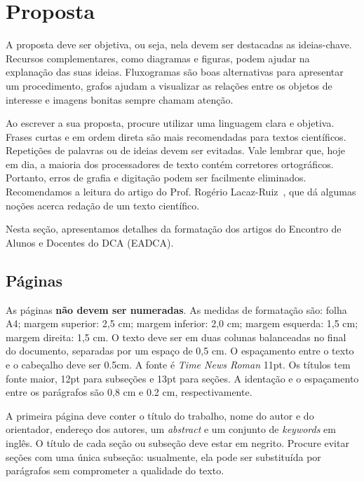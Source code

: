 \documentclass[11pt]{article}
\begin{document}
  \section{Proposta}
  \label{sec:detalhes}

  A proposta deve ser objetiva, ou seja, nela devem ser destacadas as
  ideias-chave.  Recursos complementares, como diagramas e figuras,
  podem ajudar na explanação das suas ideias.  Fluxogramas são boas
  alternativas para apresentar um procedimento, grafos ajudam a
  visualizar as relações entre os objetos de interesse e imagens
  bonitas sempre chamam atenção.

   Ao escrever a sua proposta, procure utilizar uma linguagem clara e
   objetiva. Frases curtas e em ordem direta são mais recomendadas
   para textos científicos. Repetições de palavras ou de ideias devem
   ser evitadas. Vale lembrar que, hoje em dia, a maioria dos
   processadores de texto contém corretores ortográficos. Portanto,
   erros de grafia e digitação podem ser facilmente
   eliminados. Recomendamos a leitura do artigo do Prof. Rogério
   Lacaz-Ruiz~\cite{LR}, que dá algumas noções acerca redação de um texto
   científico.

  Nesta seção, apresentamos detalhes da formatação dos artigos do
  Encontro de Alunos e Docentes do DCA (EADCA).


\subsection{Páginas}
\label{sec:paginas}

As páginas {\bf não devem ser numeradas}. As medidas de formatação
são: folha A4; margem superior: 2,5 cm; margem inferior: 2,0 cm;
margem esquerda: 1,5 cm; margem direita: 1,5 cm. O texto deve ser em
duas colunas balanceadas no final do documento, separadas por um
espaço de 0,5 cm. O espaçamento entre o texto e o cabeçalho deve ser
0.5cm. A fonte é {\it Time News Roman\/} 11pt. Os títulos tem fonte maior, 
12pt para subseções e 13pt para seções.  A identação e o espaçamento 
entre os parágrafos são 0,8 cm e 0.2 cm, respectivamente.

A primeira página deve conter o título do trabalho, nome do autor e do
orientador, endereço dos autores, um {\it abstract\/} e um conjunto de
{\it keywords\/} em inglês. O título de cada seção ou subseção deve
estar em negrito. Procure evitar seções com uma única subseção: usualmente,
ela pode ser substituída por parágrafos sem comprometer a qualidade do texto.
\end{document}
